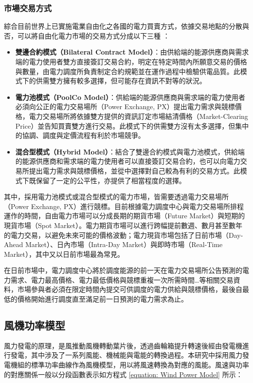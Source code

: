 \subsubsection{市場交易方式}

綜合目前世界上已實施電業自由化之各國的電力買賣方式，依據交易地點的分散與否，可以將自由化電力市場的交易方式分成以下三種 \cite{li2005strategic}：

\begin{itemize}
  \item \textbf{雙邊合約模式（Bilateral Contract Model）}：由供給端的能源供應商與需求端的電力使用者雙方直接簽訂交易合約，明定在特定時間內所願意交易的價格與數量，由電力調度所負責制定合約規範並在運作過程中檢驗供電品質。此模式下的供需雙方擁有較多選擇，但可能存在資訊不對等的狀況。
  \item \textbf{電力池模式（PoolCo Model）}：供給端的能源供應商與需求端的電力使用者必須向公正的電力交易場所（Power Exchange, PX）提出電力需求與競標價格，電力交易場所將依據雙方提供的資訊訂定市場結清價格（Market-Clearing Price）並告知買賣雙方進行交易。此模式下的供需雙方沒有太多選擇，但集中的協調、調度與定價流程有利於市場競爭。
  \item \textbf{混合型模式（Hybrid Model）}：結合了雙邊合約模式與電力池模式，供給端的能源供應商和需求端的電力使用者可以直接簽訂交易合約，也可以向電力交易所提出電力需求與競標價格，並從中選擇對自己較為有利的交易方式。此模式下既保留了一定的公平性，亦提供了相當程度的選擇。
\end{itemize}

其中，採用電力池模式或混合型模式的電力市場，皆需要透過電力交易場所（Power Exchange, PX）進行競標。目前根據電力調度中心與電力交易場所排程運作的時間，自由電力市場可以分成長期的期貨市場（Future Market）與短期的現貨市場（Spot Market）。電力期貨市場可以進行跨幅提前數週、數月甚至數年的電力交易，以避免未來可能的價格波動；電力現貨市場包括了日前市場（Day-Ahead Market）、日內市場（Intra-Day Market）與即時市場（Real-Time Market），其中又以日前市場最為常見。

在日前市場中，電力調度中心將於調度能源的前一天在電力交易場所公告預測的電力需求、電力最高價格、電力最低價格與競標重複一次所需時間…等相關交易資料，市場參與者必須在限定時間內提交可供調度的電力供給與競標價格，最後自最低的價格開始進行調度直至滿足前一日預測的電力需求為止。

\subsection{風機功率模型}

風力發電的原理，是風推動風機轉動葉片後，透過齒輪箱提升轉速後經由發電機進行發電，其中涉及了一系列風能、機械能與電能的轉換過程。本研究中採用風力發電機組的標準功率曲線作為風機模型，用以將風速轉換為對應的風能。風速與功率的對應關係一般以分段函數表示如方程式 \eqref{equation: Wind Power Model} 所示：

